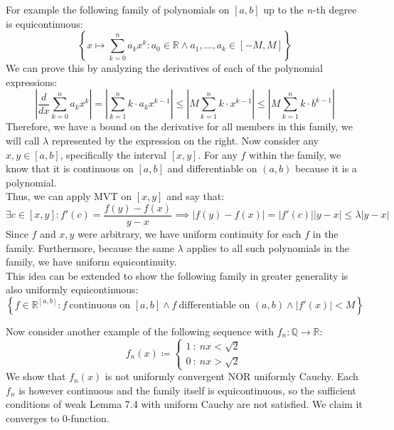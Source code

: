 \documentclass[10pt,letterpaper]{article} %
\begin{document}
For example the following family of polynomials on $[a, b]$ up to the $n$-th degree is equicontinuous:
\begin{equation*}
  \left\{x \mapsto \sum_{k=0}^{n}a_kx^k: a_0 \in \mathbb{R} \land a_1,...,a_k \in [-M, M]\right\}
\end{equation*}
We can prove this by analyzing the derivatives of each of the polynomial expressions:
\begin{equation*}
  \left|\frac{d}{dx}\sum_{k=0}^{n}a_kx^k\right| = \left|\sum_{k=1}^{n}k \cdot a_k x^{k-1}\right| \leqslant \left|M\sum_{k=1}^{n}k \cdot x^{k-1}\right| \leqslant \left|M\sum_{k=1}^{n}k \cdot b^{k-1}\right|
\end{equation*}
Therefore, we have a bound on the derivative for all members in this family, we will call $\lambda$ represented by the expression on the right. Now consider any $x, y \in [a, b]$, specifically the interval $[x, y]$. For any $f$ within the family, we know that it is continuous on $[a, b]$ and differentiable on $(a, b)$ because it is a polynomial.\\

Thus, we can apply MVT on $[x, y]$ and say that:
\begin{equation*}
  \exists c \in [x, y]: f'(c) = \frac{f(y) - f(x)}{y-x} \implies |f(y) - f(x)| = |f'(c)||y-x| \leqslant \lambda|y-x|
\end{equation*}
Since $f$ and $x, y$ were arbitrary, we have uniform continuity for each $f$ in the family. Furthermore, because the same $\lambda$ applies to all such polynomials in the family, we have uniform equicontinuity.\\

This idea can be extended to show the following family in greater generality is also uniformly equicontinuous:
\begin{equation*}
\left\{f \in \mathbb{R}^{[a, b]}: f \ \text{continuous on } [a, b] \land f \ \text{differentiable on } (a, b) \land |f'(x)| < M\right\}
\end{equation*}

Now consider another example of the following sequence with $f_n: \mathbb{Q} \xrightarrow{} \mathbb{R}$:
\begin{equation*}
  f_n(x) \coloneq \begin{cases*}
    1 \ : \ nx < \sqrt{2}\\
    0 \ : \ nx > \sqrt{2}
  \end{cases*}
\end{equation*}
We show that $f_n(x)$ is not uniformly convergent NOR uniformly Cauchy. Each $f_n$ is however continuous and the family itself is equicontinuous, so the sufficient conditions of weak Lemma 7.4 with uniform Cauchy are not satisfied. We claim it converges to $0$-function.\\
\end{document}
